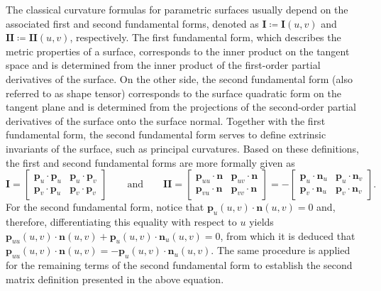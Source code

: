 The classical curvature formulas for parametric surfaces usually depend on the associated first and second fundamental forms, denoted as $\bm{I}\coloneqq\bm{I}\left(u,v\right)$ and $\bm{II}\coloneqq\bm{II}\left(u,v\right)$, respectively.
The first fundamental form, which describes the metric properties of a surface, corresponds to the inner product on the tangent space and is determined from the inner product of the first-order partial derivatives of the surface.
On the other side, the second fundamental form (also referred to as shape tensor) corresponds to the surface quadratic form on the tangent plane and is determined from the projections of the second-order partial derivatives of the surface onto the surface normal.
Together with the first fundamental form, the second fundamental form serves to define extrinsic invariants of the surface, such as principal curvatures.
Based on these definitions, the first and second fundamental forms are more formally given as
\begin{equation}
\bm{I}
=
\begin{bmatrix}
\bm{p}_{u}\cdot\bm{p}_{u} & \bm{p}_{u}\cdot\bm{p}_{v}\\
\bm{p}_{v}\cdot\bm{p}_{u} & \bm{p}_{v}\cdot\bm{p}_{v}
\end{bmatrix}
\qquad
\textrm{and}
\qquad
\bm{II}
=
\begin{bmatrix}
\bm{p}_{uu}\cdot\bm{n} & \bm{p}_{uv}\cdot\bm{n}\\
\bm{p}_{vu}\cdot\bm{n} & \bm{p}_{vv}\cdot\bm{n}
\end{bmatrix}
=
-\begin{bmatrix}
\bm{p}_{u}\cdot\bm{n}_{u} & \bm{p}_{u}\cdot\bm{n}_{v}\\
\bm{p}_{v}\cdot\bm{n}_{u} & \bm{p}_{v}\cdot\bm{n}_{v}
\end{bmatrix}.
\end{equation}
For the second fundamental form, notice that $\bm{p}_{u}\left(u,v\right)\cdot\bm{n}\left(u,v\right)=0$ and, therefore, differentiating this equality with respect to $u$ yields $\bm{p}_{uu}\left(u,v\right)\cdot\bm{n}\left(u,v\right)+\bm{p}_{u}\left(u,v\right)\cdot\bm{n}_{u}\left(u,v\right)=0$, from which it is deduced that $\bm{p}_{uu}\left(u,v\right)\cdot\bm{n}\left(u,v\right)=-\bm{p}_{u}\left(u,v\right)\cdot\bm{n}_{u}\left(u,v\right)$.
The same procedure is applied for the remaining terms of the second fundamental form to establish the second matrix definition presented in the above equation.

